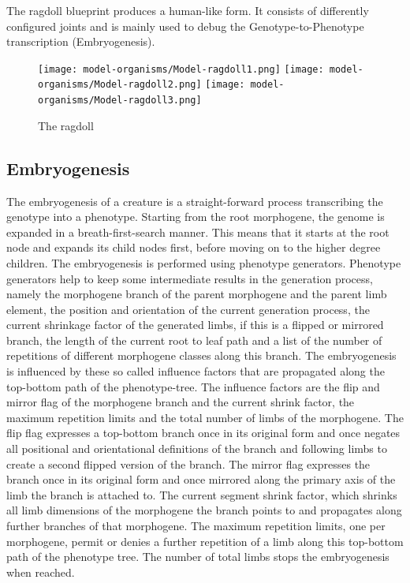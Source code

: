 \documentclass[main]{subfiles}
\begin{document}
The ragdoll blueprint produces a human-like form. It consists of differently configured joints and is mainly used to debug the Genotype-to-Phenotype transcription (Embryogenesis).

\begin{figure}[H]
\centering
\texttt{[image: model-organisms/Model-ragdoll1.png]}
\texttt{[image: model-organisms/Model-ragdoll2.png]}
\texttt{[image: model-organisms/Model-ragdoll3.png]}
\caption[The ragdoll]{The ragdoll}
\label{figure:ragdoll}
\end{figure}

\subsection{Embryogenesis}
\label{subsec:embryogenesis}

The embryogenesis of a creature is a straight-forward process transcribing the genotype into a phenotype. Starting from the root morphogene, the genome is expanded in a breath-first-search manner. This means that it starts at the root node and expands its child nodes first, before moving on to the higher degree children. The embryogenesis is performed using phenotype generators. Phenotype generators help to keep some intermediate results in the generation process, namely the morphogene branch of the parent morphogene and the parent limb element, the position and orientation of the current generation process, the current shrinkage factor of the generated limbs, if this is a flipped or mirrored branch, the length of the current root to leaf path and a list of the number of repetitions of different morphogene classes along this branch.  The embryogenesis is influenced by these so called influence factors that are propagated along the top-bottom path of the phenotype-tree. The influence factors are the flip and mirror flag of the morphogene branch and the current shrink factor, the maximum repetition limits and the total number of limbs of the morphogene. The flip flag expresses a top-bottom branch once in its original form and once negates all positional and orientational definitions of the branch and following limbs to create a second flipped version of the branch. The mirror flag expresses the branch once in its original form and once mirrored along the primary axis of the limb the branch is attached to. The current segment shrink factor, which shrinks all limb dimensions of the morphogene the branch points to and propagates along further branches of that morphogene. The maximum repetition limits, one per morphogene, permit or denies a further repetition of a limb along this top-bottom path of the phenotype tree. The number of total limbs stops the embryogenesis when reached.
\end{document}
